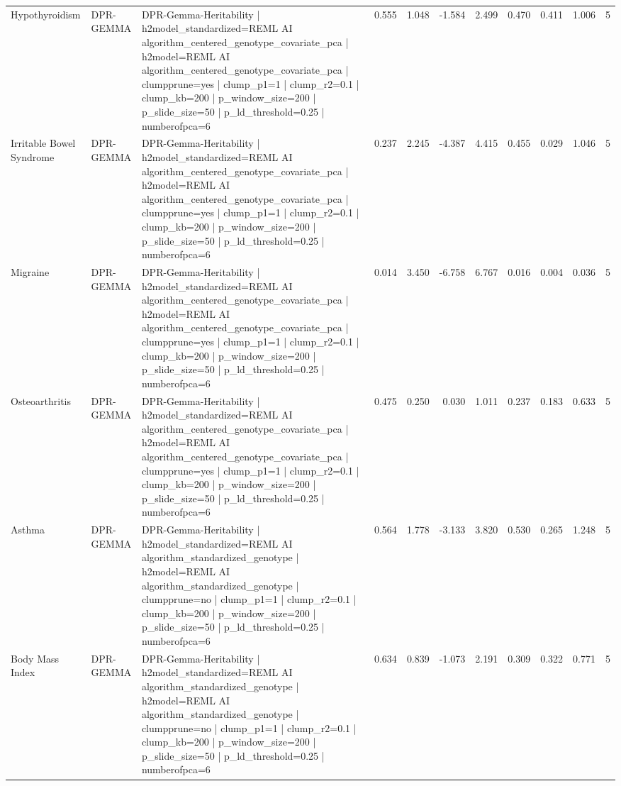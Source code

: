 \begin{landscape}
\begin{longtable}{p{2.4cm}p{1.8cm}p{6.0cm}rrrrrrrr}
Hypothyroidism & DPR-GEMMA & DPR-Gemma-Heritability | h2model\_standardized=REML AI algorithm\_centered\_genotype\_covariate\_pca | h2model=REML AI algorithm\_centered\_genotype\_covariate\_pca | clumpprune=yes | clump\_p1=1 | clump\_r2=0.1 | clump\_kb=200 | p\_window\_size=200 | p\_slide\_size=50 | p\_ld\_threshold=0.25 | numberofpca=6 & 0.555 & 1.048 & -1.584 & 2.499 & 0.470 & 0.411 & 1.006 & 5 \\
Irritable Bowel Syndrome & DPR-GEMMA & DPR-Gemma-Heritability | h2model\_standardized=REML AI algorithm\_centered\_genotype\_covariate\_pca | h2model=REML AI algorithm\_centered\_genotype\_covariate\_pca | clumpprune=yes | clump\_p1=1 | clump\_r2=0.1 | clump\_kb=200 | p\_window\_size=200 | p\_slide\_size=50 | p\_ld\_threshold=0.25 | numberofpca=6 & 0.237 & 2.245 & -4.387 & 4.415 & 0.455 & 0.029 & 1.046 & 5 \\
Migraine & DPR-GEMMA & DPR-Gemma-Heritability | h2model\_standardized=REML AI algorithm\_centered\_genotype\_covariate\_pca | h2model=REML AI algorithm\_centered\_genotype\_covariate\_pca | clumpprune=yes | clump\_p1=1 | clump\_r2=0.1 | clump\_kb=200 | p\_window\_size=200 | p\_slide\_size=50 | p\_ld\_threshold=0.25 | numberofpca=6 & 0.014 & 3.450 & -6.758 & 6.767 & 0.016 & 0.004 & 0.036 & 5 \\
Osteoarthritis & DPR-GEMMA & DPR-Gemma-Heritability | h2model\_standardized=REML AI algorithm\_centered\_genotype\_covariate\_pca | h2model=REML AI algorithm\_centered\_genotype\_covariate\_pca | clumpprune=yes | clump\_p1=1 | clump\_r2=0.1 | clump\_kb=200 | p\_window\_size=200 | p\_slide\_size=50 | p\_ld\_threshold=0.25 | numberofpca=6 & 0.475 & 0.250 & 0.030 & 1.011 & 0.237 & 0.183 & 0.633 & 5 \\
Asthma & DPR-GEMMA & DPR-Gemma-Heritability | h2model\_standardized=REML AI algorithm\_standardized\_genotype | h2model=REML AI algorithm\_standardized\_genotype | clumpprune=no | clump\_p1=1 | clump\_r2=0.1 | clump\_kb=200 | p\_window\_size=200 | p\_slide\_size=50 | p\_ld\_threshold=0.25 | numberofpca=6 & 0.564 & 1.778 & -3.133 & 3.820 & 0.530 & 0.265 & 1.248 & 5 \\
Body Mass Index & DPR-GEMMA & DPR-Gemma-Heritability | h2model\_standardized=REML AI algorithm\_standardized\_genotype | h2model=REML AI algorithm\_standardized\_genotype | clumpprune=no | clump\_p1=1 | clump\_r2=0.1 | clump\_kb=200 | p\_window\_size=200 | p\_slide\_size=50 | p\_ld\_threshold=0.25 | numberofpca=6 & 0.634 & 0.839 & -1.073 & 2.191 & 0.309 & 0.322 & 0.771 & 5 \\

\end{longtable}
\end{landscape}
